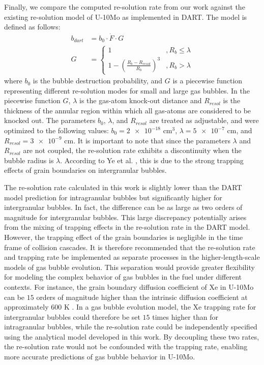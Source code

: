 \documentclass[review]{elsarticle}
\begin{document}
Finally, we compare the computed re-solution rate from our work
against the existing re-solution model of U-10Mo as implemented in DART.
The model is defined as follows:
\begin{align}
	b_{dart} &= b_0 \cdot \dot{F} \cdot G \\
	G &=
	\begin{cases}
		1 & ,R_b \leq \lambda \\
		1 - (\frac{R_b - R_{resol}}{R_b})^3
		  & ,R_b > \lambda
	\end{cases}
\end{align}
where $b_0$ is the bubble destruction probability,
and $G$ is a piecewise function representing
different re-solution modes for small and large gas bubbles.
In the piecewise function $G$,
$\lambda$ is the gas-atom knock-out distance
and $R_{resol}$ is the thickness of the annular region
within which all gas-atoms are considered to be knocked out.
The parameters $b_0$, $\lambda$, and $R_{resol}$ are treated as adjustable,
and were optimized to the following values:
$b_0 = \num{2e-18}$ cm$^3$, $\lambda = \num{5e-7}$ cm,
and $R_{resol} = \num{3e-9}$ cm.
It is important to note that
since the parameters $\lambda$ and $R_{resol}$ are not coupled,
the re-solution rate exhibits a discontinuity
when the bubble radius is $\lambda$.
According to Ye et al. \cite{ye2023},
this is due to the strong trapping effects of grain boundaries
on intergranular bubbles.

The re-solution rate calculated in this work is slightly lower than
the DART model prediction for intragranular bubbles
but significantly higher for intergranular bubbles.
In fact, the difference can be as large as two orders of magnitude
for intergranular bubbles.
This large discrepancy potentially arises from the mixing of trapping effects
in the re-solution rate in the DART model.
However, the trapping effect of the grain boundaries
is negligible in the time frame of collision cascades.
It is therefore recommended that
the re-solution rate and trapping rate be implemented as separate processes
in the higher-length-scale models of gas bubble evolution.
This separation would provide greater flexibility
for modeling the complex behavior of gas bubbles in the fuel
under different contexts.
For instance, the grain boundary diffusion coefficient of Xe in U-10Mo can be
$15$ orders of magnitude higher than the intrinsic diffusion coefficient
at approximately 600 K \cite{hasan2024gb}.
In a gas bubble evolution model,
the Xe trapping rate for intergranular bubbles could therefore be set
$15$ times higher than for intragranular bubbles,
while the re-solution rate could be independently specified
using the analytical model developed in this work.
By decoupling these two rates,
the re-solution rate would not be confounded with the trapping rate,
enabling more accurate predictions of gas bubble behavior in U-10Mo.
\end{document}
